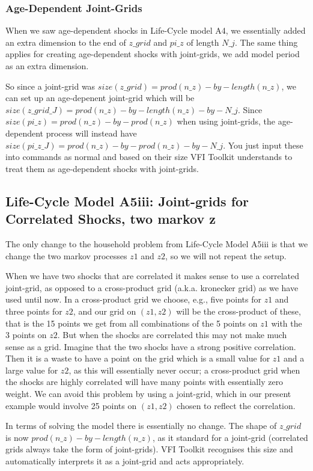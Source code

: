 \subsubsection{Age-Dependent Joint-Grids}
When we saw age-dependent shocks in Life-Cycle model A4, we essentially added an extra dimension to the end of $z\_{}grid$ and $pi\_{}z$ of length $N\_{}j$. The same thing applies for creating age-dependent shocks with joint-grids, we add model period as an extra dimension.

So since a joint-grid was  $size(z\_{}grid)=prod(n\_{}z)-by-length(n\_{}z)$, we can set up an age-depenent joint-grid which will be $size(z\_{}grid\_{}J)=prod(n\_{}z)-by-length(n\_{}z)-by-N\_{}j$. Since $size(pi\_{}z)=prod(n\_{}z)-by-prod(n\_{}z)$ when using joint-grids, the age-dependent process will instead have $size(pi\_{}z\_{}J)=prod(n\_{}z)-by-prod(n\_{}z)-by-N\_{}j$. You just input these into commands as normal and based on their size VFI Toolkit understands to treat them as age-dependent shocks with joint-grids.

\subsection{Life-Cycle Model A5iii: Joint-grids for Correlated Shocks, two markov z}
The only change to the household problem from Life-Cycle Model A5iii is that we change the two markov processes $z1$ and $z2$, so we will not repeat the setup.

When we have two shocks that are correlated it makes sense to use a correlated joint-grid, as opposed to a cross-product grid (a.k.a. kronecker grid) as we have used until now. In a cross-product grid we choose, e.g., five points for $z1$ and three points for $z2$, and our grid on $(z1,z2)$ will be the cross-product of these, that is the 15 points we get from all combinations of the 5 points on $z1$ with the 3 points on $z2$. But when the shocks are correlated this may not make much sense as a grid. Imagine that the two shocks have a strong positive correlation. Then it is a waste to have a point on the grid which is a small value for $z1$ and a large value for $z2$, as this will essentially never occur; a cross-product grid when the shocks are highly correlated will have many points with essentially zero weight. We can avoid this problem by using a joint-grid, which in our present example would involve 25 points on $(z1,z2)$ chosen to reflect the correlation.

In terms of solving the model there is essentially no change. The shape of $z\_{}grid$ is now $prod(n\_{}z)-by-length(n\_{}z)$, as it standard for a joint-grid (correlated grids always take the form of joint-grids). VFI Toolkit recognises this size and automatically interprets it as a joint-grid and acts appropriately.

